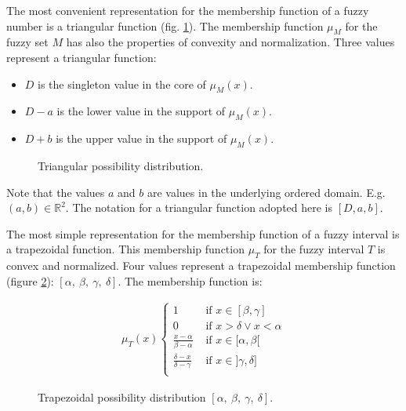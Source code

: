 The most convenient representation for the membership function of a fuzzy number is a triangular function (fig. \ref{fig:triangular}). The membership function $\mu_M$ for the fuzzy set $M$ has also the properties of convexity and normalization. Three values represent a triangular function: 
\begin{itemize}
\item
$D$ is the singleton value in the core of $\mu_M(x)$.
\item
$D-a$ is the lower value in the support of $\mu_M(x)$. 
\item
$D+b$ is the upper value in the support of $\mu_M(x)$.
\end{itemize}

\begin{figure}
\centering

\caption{Triangular possibility distribution. }
\label{fig:triangular}
\end{figure}

Note that the values $a$ and $b$ are values in the underlying ordered domain. E.g. $(a,b) \in \mathbb{R}^2$. The notation for a triangular function adopted here is $[D,a,b]$.

The most simple representation for the membership function of a fuzzy interval is a trapezoidal function. This membership function $\mu_T$ for the fuzzy interval $T$ is convex and normalized. Four values represent a trapezoidal membership function (figure  \ref{fig:trapezoidal}):
 $\left[\alpha,\ \beta,\ \gamma,\ \delta\right]$. The membership function is:

\begin{align}
\mu_T(x)
\begin{cases}
1 & \mbox{ if } x \in [\beta,\gamma] \\
0 & \mbox{ if } x > \delta \vee x < \alpha \\
\frac{x-\alpha}{\beta - \alpha} & \mbox{ if } x \in [\alpha,\beta[ \\
\frac{\delta -x}{\delta - \gamma} & \mbox{ if } x \in ]\gamma,\delta] \\
\end{cases}
\end{align}

 
\begin{figure}
\centering

\caption{Trapezoidal possibility distribution $\left[\alpha,\ \beta,\ \gamma,\ \delta\right]$. }
\label{fig:trapezoidal}
\end{figure}